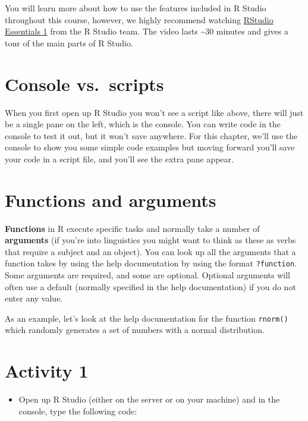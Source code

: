 \documentclass[
  oneside]{book}
\providecommand{\tightlist}{%
  \setlength{\itemsep}{0pt}\setlength{\parskip}{0pt}}
\begin{document}
You will learn more about how to use the features included in R Studio throughout this course, however, we highly recommend watching \href{https://rstudio.com/resources/webinars/programming-part-1-writing-code-in-rstudio/}{RStudio Essentials 1} from the R Studio team. The video lasts \textasciitilde30 minutes and gives a tour of the main parts of R Studio.

\hypertarget{console-vs.-scripts}{%
\section{Console vs.~scripts}\label{console-vs.-scripts}}

When you first open up R Studio you won't see a script like above, there will just be a single pane on the left, which is the console. You can write code in the console to test it out, but it won't save anywhere. For this chapter, we'll use the console to show you some simple code examples but moving forward you'll save your code in a script file, and you'll see the extra pane appear.

\hypertarget{functions-and-arguments}{%
\section{Functions and arguments}\label{functions-and-arguments}}

\textbf{Functions} in R execute specific tasks and normally take a number of \textbf{arguments} (if you're into linguistics you might want to think as these as verbs that require a subject and an object). You can look up all the arguments that a function takes by using the help documentation by using the format \texttt{?function}. Some arguments are required, and some are optional. Optional arguments will often use a default (normally specified in the help documentation) if you do not enter any value.

As an example, let's look at the help documentation for the function \texttt{rnorm()} which randomly generates a set of numbers with a normal distribution.

\hypertarget{activity-1-1}{%
\section{Activity 1}\label{activity-1-1}}

\begin{itemize}
\tightlist
\item
  Open up R Studio (either on the server or on your machine) and in the console, type the following code:
\end{itemize}
\end{document}
